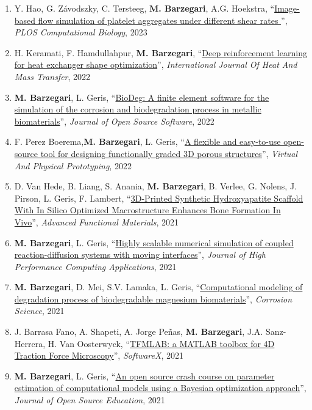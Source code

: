 \documentclass{cv}
\begin{document}
\begin{enumerate}[itemsep=-0.2ex]
{}'', \textit{Journal of Functional Biomaterials}, 2023
\item
Y. Hao, G. Závodszky, C. Tersteeg, \textbf{M. Barzegari}, A.G. Hoekstra, ``\href{https://doi.org/10.1371/journal.pcbi.1010965}{Image-based flow simulation of platelet aggregates under different shear rates
}'', \textit{PLOS Computational Biology}, 2023
\item
H. Keramati, F. Hamdullahpur, \textbf{M. Barzegari}, ``\href{https://doi.org/10.1016/j.ijheatmasstransfer.2022.123112}{Deep reinforcement learning for heat exchanger shape optimization}'', \textit{International  Journal Of Heat And Mass Transfer}, 2022
\item
\textbf{M. Barzegari}, L. Geris, ``\href{https://doi.org/10.21105/joss.04281}{BioDeg: A finite element software for the simulation of the corrosion and biodegradation process in metallic biomaterials}'', \textit{Journal of Open Source Software}, 2022
\item
F. Perez Boerema,\textbf{M. Barzegari}, L. Geris, ``\href{https://doi.org/10.1080/17452759.2022.2048956}{A flexible and easy-to-use open-source tool for designing functionally graded 3D porous structures}'', \textit{Virtual And Physical Prototyping}, 2022
\item
D. Van Hede, B. Liang, S. Anania, \textbf{M. Barzegari}, B. Verlee, G. Nolens, J. Pirson, L. Geris, F. Lambert, ``\href{https://doi.org/10.1002/adfm.202105002}{3D-Printed Synthetic Hydroxyapatite Scaffold With In Silico Optimized Macrostructure Enhances Bone Formation In Vivo}'', \textit{Advanced Functional Materials}, 2021
\item
\textbf{M. Barzegari}, L. Geris, ``\href{https://doi.org/10.1177/10943420211045939}{Highly scalable numerical simulation of coupled reaction-diffusion systems with moving interfaces}'', \textit{Journal of High Performance Computing Applications}, 2021
\item
\textbf{M. Barzegari}, D. Mei, S.V. Lamaka, L. Geris, ``\href{https://doi.org/10.1016/j.corsci.2021.109674}{Computational modeling of degradation process of biodegradable magnesium biomaterials}'', \textit{Corrosion Science}, 2021
\item
J. Barrasa Fano, A. Shapeti, A. Jorge Peñas, \textbf{M. Barzegari}, J.A. Sanz-Herrera, H. Van Oosterwyck, ``\href{https://doi.org/10.1016/j.softx.2021.100723}{TFMLAB: a MATLAB toolbox for 4D Traction Force Microscopy}'', \textit{SoftwareX}, 2021 
\item
\textbf{M. Barzegari}, L. Geris, ``\href{https://doi.org/10.21105/jose.00089}{An open source crash course on parameter estimation of computational models using a Bayesian optimization approach}'', \textit{Journal of Open Source Education}, 2021

\end{enumerate}
\end{document}
